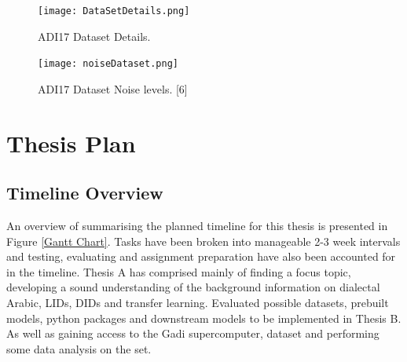 \begin{figure}[h!]
    \centering
    \texttt{[image: DataSetDetails.png]}
    \caption{ADI17 Dataset Details.}
    \label{fig:ADI17}
\end{figure}


\begin{figure}[H]
\end{figure}

\begin{figure}[H]
\end{figure}

\begin{figure}[h!]
    \centering
    \texttt{[image: noiseDataset.png]}
    \caption{ADI17 Dataset Noise levels. [6]}
    \label{fig:noiseDataSet}
\end{figure}





\chapter{Thesis Plan}\label{ch:plan}
\section{Timeline Overview}
An overview of summarising the planned timeline for this thesis is presented in 
Figure \ref{Gantt Chart}. Tasks have been broken into manageable 2-3 week intervals and testing, evaluating
and assignment preparation have also been accounted for in the timeline. 
Thesis A has comprised mainly of finding a focus topic, developing a sound understanding of the background information on dialectal Arabic, 
LIDs, DIDs and transfer learning. Evaluated possible datasets, prebuilt models, python packages and downstream models 
to be implemented in Thesis B. As well as gaining access to the Gadi supercomputer, dataset and performing some data analysis on the set. 

